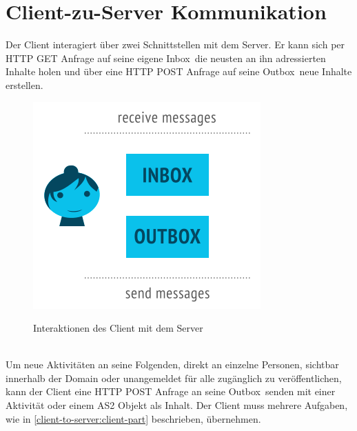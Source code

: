 \section{Client-zu-Server Kommunikation}
	Der Client interagiert über zwei Schnittstellen mit dem Server. Er kann sich per HTTP GET Anfrage auf seine eigene \glqq Inbox\grqq~die neusten an ihn adressierten Inhalte holen und über eine HTTP POST Anfrage auf seine \glqq Outbox\grqq~neue Inhalte erstellen.
	\begin{figure}[h]
		\centering
		\includegraphics[scale=0.6]{figures/inbox-outbox.png}
		\label{Client zu Server Interaktionen}
		\caption{Interaktionen des Client mit dem Server}
	\end{figure}\\
	Um neue Aktivitäten an seine Folgenden, direkt an einzelne Personen, sichtbar innerhalb der Domain oder unangemeldet für alle zugänglich zu veröffentlichen, kann der Client eine HTTP POST Anfrage an seine \glqq Outbox\grqq~senden mit einer Aktivität oder einem \gls{AS2} Objekt als Inhalt. Der Client muss mehrere Aufgaben, wie in \ref{client-to-server:client-part} beschrieben, übernehmen.
	
